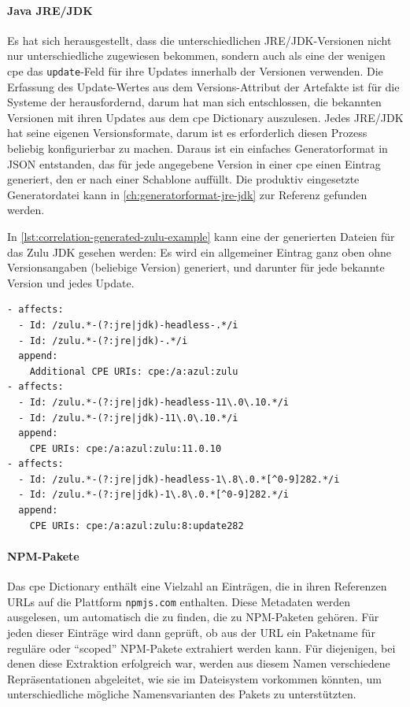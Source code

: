 \paragraph{Java JRE/JDK}
Es hat sich herausgestellt, dass die unterschiedlichen JRE/JDK-Versionen nicht nur unterschiedliche  zugewiesen bekommen, sondern auch als eine der wenigen \acrshort{cpe} das \texttt{update}-Feld für ihre Updates innerhalb der Versionen verwenden.
Die Erfassung des Update-Wertes aus dem Versions-Attribut der Artefakte ist für die Systeme der \metaeffektsp herausfordernd, darum hat man sich entschlossen, die bekannten Versionen mit ihren Updates aus dem \acrshort{cpe} Dictionary auszulesen.
Jedes JRE/JDK hat seine eigenen Versionsformate, darum ist es erforderlich diesen Prozess beliebig konfigurierbar zu machen.
Daraus ist ein einfaches Generatorformat in JSON entstanden, das für jede angegebene Version in einer \acrshort{cpe} einen Eintrag generiert, den er nach einer Schablone auffüllt.
Die produktiv eingesetzte Generatordatei kann in \autoref{ch:generatorformat-jre-jdk} zur Referenz gefunden werden.

In \autoref{lst:correlation-generated-zulu-example} kann eine der generierten Dateien für das Zulu JDK gesehen werden:
Es wird ein allgemeiner Eintrag ganz oben ohne Versionsangaben (beliebige Version) generiert, und darunter für jede bekannte Version und jedes Update.

\begin{lstlisting}[style=yaml,caption={Automatisch generierte Korrelationseinträge zu Zulu JDK},label={lst:correlation-generated-zulu-example}]
- affects:
  - Id: /zulu.*-(?:jre|jdk)-headless-.*/i
  - Id: /zulu.*-(?:jre|jdk)-.*/i
  append:
    Additional CPE URIs: cpe:/a:azul:zulu
- affects:
  - Id: /zulu.*-(?:jre|jdk)-headless-11\.0\.10.*/i
  - Id: /zulu.*-(?:jre|jdk)-11\.0\.10.*/i
  append:
    CPE URIs: cpe:/a:azul:zulu:11.0.10
- affects:
  - Id: /zulu.*-(?:jre|jdk)-headless-1\.8\.0.*[^0-9]282.*/i
  - Id: /zulu.*-(?:jre|jdk)-1\.8\.0.*[^0-9]282.*/i
  append:
    CPE URIs: cpe:/a:azul:zulu:8:update282
\end{lstlisting}

\paragraph{NPM-Pakete}

Das \acrshort{cpe} Dictionary enthält eine Vielzahl an Einträgen, die in ihren Referenzen URLs auf die Plattform \texttt{npmjs.com} enthalten.
Diese Metadaten werden ausgelesen, um automatisch die  zu finden, die zu NPM-Paketen gehören.
Für jeden dieser Einträge wird dann geprüft, ob aus der URL ein Paketname für reguläre oder \enquote{scoped} NPM-Pakete extrahiert werden kann.
Für diejenigen, bei denen diese Extraktion erfolgreich war, werden aus diesem Namen verschiedene Repräsentationen abgeleitet, wie sie im Dateisystem vorkommen könnten, um unterschiedliche mögliche Namensvarianten des Pakets zu unterstützten.


